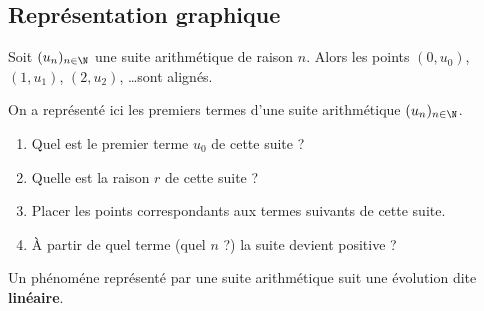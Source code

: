 \documentclass{poly}
\begin{document}
\subsection{Représentation graphique}
\begin{proposition}
Soit $(u_n)_{n \in \N}$ une suite arithmétique de raison $n$. Alors les points $(0,u_0)$, $(1,u_1)$, $(2,u_2)$, \dots sont alignés.
\end{proposition}
\begin{example}
\hfill
\begin{center}
\end{center}
On a représenté ici les premiers termes d'une suite arithmétique $(u_n)_{n \in \N}$.
\begin{enumerate}[label=\emph{\alph*)}]
\item Quel est le premier terme $u_0$ de cette suite ? \answerline
\item Quelle est la raison $r$ de cette suite ? \answerline
\item Placer les points correspondants aux termes suivants de cette suite.
\item À partir de quel terme (quel $n$ ?) la suite devient positive ? \answerline
\end{enumerate}
\end{example}
\begin{tcolorbox}
\begin{remark}
Un phénoméne représenté par une suite arithmétique suit une évolution dite \textbf{linéaire}.        
\end{remark}
\end{tcolorbox}
\newpage
\end{document}
